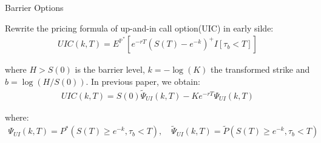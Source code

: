 \documentclass{beamer}
\begin{document}
\begin{frame}{Barrier Options}

    {\footnotesize \footnotesize
    \par Rewrite the pricing formula of up-and-in call option(UIC) in early silde:
     \pause 
    \begin{align*}
        UIC(k,T) = E^{\mathbb{P}^*} \left[ e^{-rT} \left( S(T) - e^{-k} \right)^+ I{[\tau_b < T]} \right]
    \end{align*}
    \par where \( H > S(0) \) is the barrier level, \( k = -\log(K) \) the transformed strike and \( b = \log(H/S(0)) \). In previous paper, we obtain:
    \begin{align*}
        UIC(k,T) = S(0) \tilde{\Psi}_{UI}(k,T) - Ke^{-rT} \Psi_{UI}(k,T)
    \end{align*}
    \par where:
    \begin{align*}
        \Psi_{UI}(k,T) = P^*(S(T) \geq e^{-k},  \tau_b < T), \quad \widetilde{\Psi}_{UI}(k,T) = \widetilde{P}(S(T) \geq e^{-k},  \tau_b < T) 
    \end{align*}
    }
    
\end{frame}
\end{document}
